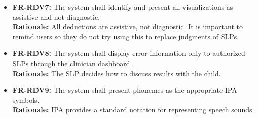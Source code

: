 \documentclass[12pt]{article}
\begin{document}
\begin {itemize}
\textbf{Rationale:} The SLP can review the current results during the session and after it ends.
\item \textbf{FR-RDV7:} The system shall identify and present all visualizations as assistive and not diagnostic. \\
\textbf{Rationale:} All deductions are assistive, not diagnostic. It is important to remind users so they do not try using this to replace judgments of SLPs.
\item \textbf{FR-RDV8:} The system shall display error information only to
authorized SLPs through the clinician dashboard. \\
\textbf{Rationale:} The SLP decides how to discuss results with the child.
\item \textbf{FR-RDV9:} The system shall present phonemes as the appropriate IPA symbols. \\
\textbf{Rationale:} IPA provides a standard notation for representing speech sounds.
\end{itemize}
\end{document}
